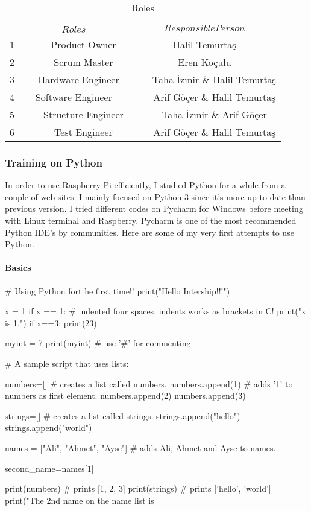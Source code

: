 \begin{table}[h!]
  \centering
 
    \begin{tabular}{c|c|c}
       &$$Roles$$ & $$Responsible Person$$ \\ \hline
       1 & ~~~~Product Owner & Halil Temurtaş  \\ \hline
       2 & ~~~~Scrum Master  & Eren Koçulu  \\ \hline
       3 & ~~Hardware Engineer & ~~~~Taha İzmir \& Halil Temurtaş \\ \hline
       4 & Software Engineer & ~~~~Arif Göçer \& Halil Temurtaş  \\ \hline
       5 & ~~~~Structure Engineer & ~~~~Taha İzmir \&  Arif Göçer \\ \hline
       6 & ~~~~Test Engineer & ~~~~Arif Göçer \& Halil Temurtaş 
      
  \end{tabular}
  \caption{Roles}
  \label{tab:roles}
\end{table}


\subsubsection{Training on Python}

In order to use Raspberry Pi efficiently, I studied Python for a while from a couple of web sites. I mainly focused on Python 3 since it’s more up to date than previous version. I tried different codes on Pycharm for Windows before meeting with Linux terminal and Raspberry. Pycharm is one of the most recommended Python IDE’s by communities.  Here are some of my very first attempts to use Python.
\\
\paragraph{Basics }

\begin{python}
# Using Python fort he first time!! 
print("Hello Intership!!!")  

x = 1 
if x == 1:
	# indented four spaces, indents works as brackets in C!
    print("x is 1.")
if x==3:
    print(23)

myint = 7
print(myint)  # use '#' for commenting 

# A sample script that uses lists:

numbers=[]	# creates a list called numbers.
numbers.append(1)	# adds '1' to numbers as first element.
numbers.append(2)
numbers.append(3)

strings=[]  # creates a list called strings.
strings.append("hello")
strings.append("world")

names = ["Ali", "Ahmet", "Ayse"]	# adds Ali, Ahmet and Ayse to names. 

second_name=names[1]

print(numbers)	# prints [1, 2, 3]
print(strings)	# prints ['hello', 'world']
print("The 2nd name on the name list is %



\end{python}

